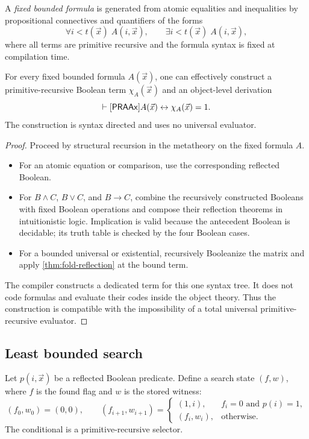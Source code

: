 A \emph{fixed bounded formula} is generated from atomic equalities and inequalities by propositional connectives and quantifiers of the forms
\[
  \forall i<t(\vec x)\;A(i,\vec x),
  \qquad
  \exists i<t(\vec x)\;A(i,\vec x),
\]
where all terms are primitive recursive and the formula syntax is fixed at compilation time.

\begin{theorem}\label{thm:booleanization}
For every fixed bounded formula \(A(\vec x)\), one can effectively construct a primitive-recursive Boolean term \(\chi_A(\vec x)\) and an object-level derivation
\[
  \vdash[\mathsf{PRAAx}] A(\vec x)\leftrightarrow \chi_A(\vec x)=1.
\]
The construction is syntax directed and uses no universal evaluator.
\end{theorem}

\begin{proof}
Proceed by structural recursion in the metatheory on the fixed formula \(A\).
\begin{itemize}
  \item For an atomic equation or comparison, use the corresponding reflected Boolean.
  \item For \(B\wedge C\), \(B\vee C\), and \(B\to C\), combine the recursively constructed Booleans with fixed Boolean operations and compose their reflection theorems in intuitionistic logic.  Implication is valid because the antecedent Boolean is decidable; its truth table is checked by the four Boolean cases.
  \item For a bounded universal or existential, recursively Booleanize the matrix and apply \cref{thm:fold-reflection} at the bound term.
\end{itemize}
The compiler constructs a dedicated term for this one syntax tree.  It does not code formulas and evaluate their codes inside the object theory.  Thus the construction is compatible with the impossibility of a total universal primitive-recursive evaluator.
\end{proof}

\subsection{Least bounded search}

Let \(p(i,\vec x)\) be a reflected Boolean predicate.  Define a search state \((f,w)\), where \(f\) is the found flag and \(w\) is the stored witness:
\[
 (f_0,w_0)=(0,0),
 \qquad
 (f_{i+1},w_{i+1})=
 \begin{cases}
   (1,i),&f_i=0\text{ and }p(i)=1,\\
   (f_i,w_i),&\text{otherwise.}
 \end{cases}
\]
The conditional is a primitive-recursive selector.

